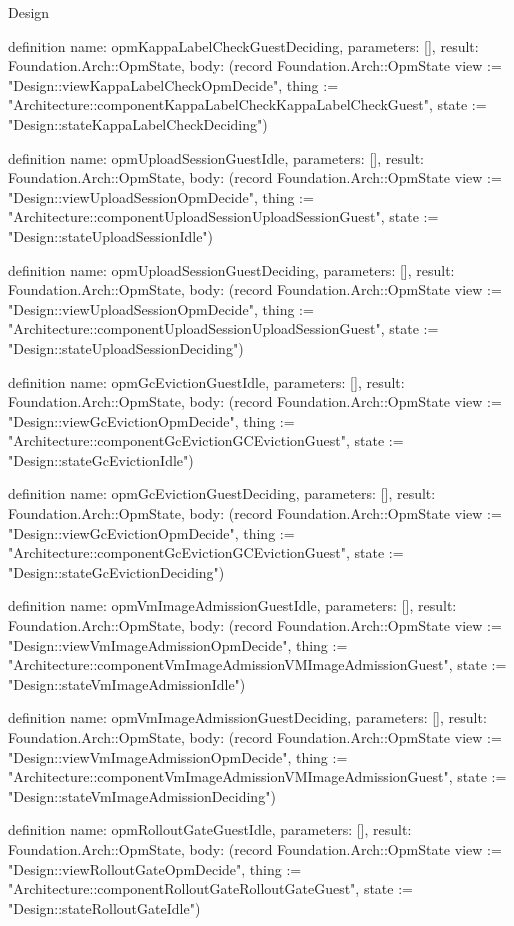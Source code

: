 \begin{lexlean}{Design}
\begin{semanticmodule}
definition{
  name: opmKappaLabelCheckGuestDeciding,
  parameters: [],
  result: Foundation.Arch::OpmState,
  body: (record Foundation.Arch::OpmState {view := "Design::viewKappaLabelCheckOpmDecide", thing := "Architecture::componentKappaLabelCheckKappaLabelCheckGuest", state := "Design::stateKappaLabelCheckDeciding"})
}

definition{
  name: opmUploadSessionGuestIdle,
  parameters: [],
  result: Foundation.Arch::OpmState,
  body: (record Foundation.Arch::OpmState {view := "Design::viewUploadSessionOpmDecide", thing := "Architecture::componentUploadSessionUploadSessionGuest", state := "Design::stateUploadSessionIdle"})
}

definition{
  name: opmUploadSessionGuestDeciding,
  parameters: [],
  result: Foundation.Arch::OpmState,
  body: (record Foundation.Arch::OpmState {view := "Design::viewUploadSessionOpmDecide", thing := "Architecture::componentUploadSessionUploadSessionGuest", state := "Design::stateUploadSessionDeciding"})
}

definition{
  name: opmGcEvictionGuestIdle,
  parameters: [],
  result: Foundation.Arch::OpmState,
  body: (record Foundation.Arch::OpmState {view := "Design::viewGcEvictionOpmDecide", thing := "Architecture::componentGcEvictionGCEvictionGuest", state := "Design::stateGcEvictionIdle"})
}

definition{
  name: opmGcEvictionGuestDeciding,
  parameters: [],
  result: Foundation.Arch::OpmState,
  body: (record Foundation.Arch::OpmState {view := "Design::viewGcEvictionOpmDecide", thing := "Architecture::componentGcEvictionGCEvictionGuest", state := "Design::stateGcEvictionDeciding"})
}

definition{
  name: opmVmImageAdmissionGuestIdle,
  parameters: [],
  result: Foundation.Arch::OpmState,
  body: (record Foundation.Arch::OpmState {view := "Design::viewVmImageAdmissionOpmDecide", thing := "Architecture::componentVmImageAdmissionVMImageAdmissionGuest", state := "Design::stateVmImageAdmissionIdle"})
}

definition{
  name: opmVmImageAdmissionGuestDeciding,
  parameters: [],
  result: Foundation.Arch::OpmState,
  body: (record Foundation.Arch::OpmState {view := "Design::viewVmImageAdmissionOpmDecide", thing := "Architecture::componentVmImageAdmissionVMImageAdmissionGuest", state := "Design::stateVmImageAdmissionDeciding"})
}

definition{
  name: opmRolloutGateGuestIdle,
  parameters: [],
  result: Foundation.Arch::OpmState,
  body: (record Foundation.Arch::OpmState {view := "Design::viewRolloutGateOpmDecide", thing := "Architecture::componentRolloutGateRolloutGateGuest", state := "Design::stateRolloutGateIdle"})
}


\end{semanticmodule}
\end{lexlean}
